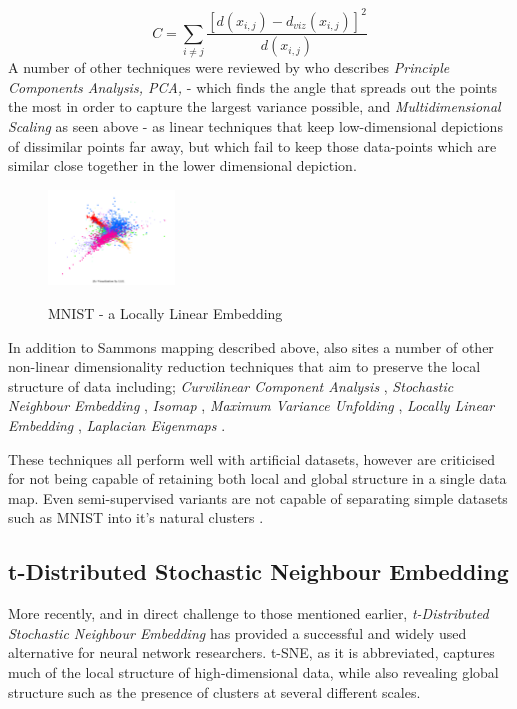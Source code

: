 \documentclass[a4paper,11pt,titlepage]{article}
\begin{document}
		$$
			C = 
			\sum\limits_{i \neq j}
			\frac{ [d(x_{i,j}) - d_{viz}(x_{i,j}) ]^2 }					{d(x_{i,j})}
		$$
		A number of other techniques were reviewed by \cite{VanderMaaten2009} who describes \textit{Principle Components Analysis, PCA,} \cite{Hotelling33} - which finds the angle that spreads out the points the most in order to capture the largest variance possible, and \textit{Multidimensional Scaling} as seen above - as linear techniques that keep low-dimensional depictions of dissimilar points far away, but which fail to keep those data-points which are similar close together in the lower dimensional depiction.
 		
 	\begin{figure}[H]
    			\centering	
			{{\includegraphics[width=0.3\textwidth]
    				{img/hinton_lle.png} 
    			}}%
    			\caption{MNIST - a Locally Linear Embedding}%
    		\label{fig:3nn}
	\end{figure}	 
 		
		\par 
		In addition to Sammons mapping described above, \cite{VanderMaaten2009} also sites a number of other non-linear dimensionality reduction techniques that aim to preserve the local structure of data including; \textit{Curvilinear Component Analysis} \cite{Demartines1995}, \textit{Stochastic Neighbour Embedding} \cite{Hinton2002}, \textit{Isomap} \cite{Tenenbaum2000}, \textit{Maximum Variance Unfolding} \cite{Weinberger2004}, \textit{Locally Linear Embedding} \cite{Roweis2000}, \textit{Laplacian Eigenmaps} \cite{Belkin2002}.

		\par 
		
		These techniques all perform well with artificial datasets, however are criticised for not being capable of retaining both local and global structure in a single data map. Even semi-supervised variants are not capable of separating simple datasets such as MNIST into it's natural clusters \cite{Song2007}. 
		\par 

	 		
 \subsection{t-Distributed Stochastic Neighbour Embedding}
		More recently, and in direct challenge to those mentioned earlier, \textit{t-Distributed Stochastic Neighbour Embedding} \cite{Maaten2008} has provided a successful and widely used alternative for neural network researchers. t-SNE, as it is abbreviated, captures much of the local structure of high-dimensional data, while also revealing global structure such as the presence of clusters at several different scales.
		\par 
		
\end{document}
